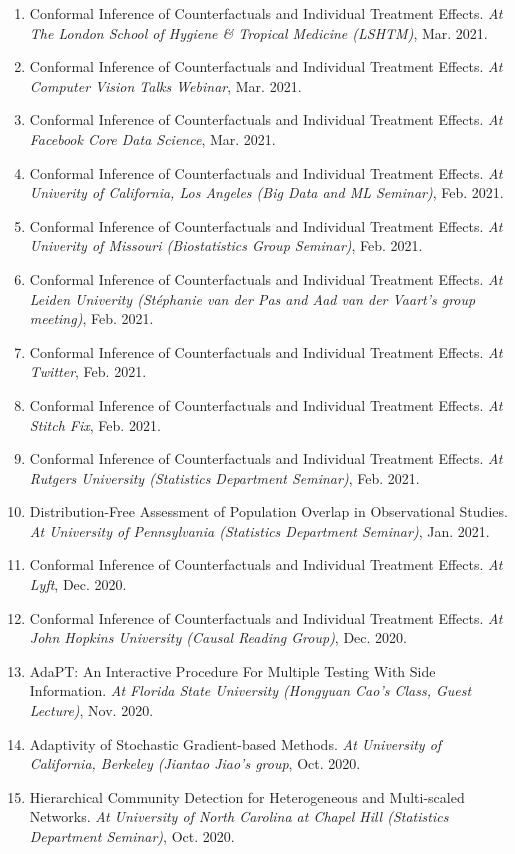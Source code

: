 \documentclass{article}
\begin{document}
\begin{enumerate}
\item Conformal Inference of Counterfactuals and Individual Treatment Effects. \emph{At The London School of Hygiene \& Tropical Medicine (LSHTM)}, Mar. 2021.
\item Conformal Inference of Counterfactuals and Individual Treatment Effects. \emph{At Computer Vision Talks Webinar}, Mar. 2021.
\item Conformal Inference of Counterfactuals and Individual Treatment Effects. \emph{At Facebook Core Data Science}, Mar. 2021.
\item Conformal Inference of Counterfactuals and Individual Treatment Effects. \emph{At Univerity of California, Los Angeles (Big Data and ML Seminar)}, Feb. 2021.
\item Conformal Inference of Counterfactuals and Individual Treatment Effects. \emph{At Univerity of Missouri (Biostatistics Group Seminar)}, Feb. 2021.
\item Conformal Inference of Counterfactuals and Individual Treatment Effects. \emph{At Leiden Univerity (Stéphanie van der Pas and Aad van der Vaart's group meeting)}, Feb. 2021.
\item Conformal Inference of Counterfactuals and Individual Treatment Effects. \emph{At Twitter}, Feb. 2021.
\item Conformal Inference of Counterfactuals and Individual Treatment Effects. \emph{At Stitch Fix}, Feb. 2021.
\item Conformal Inference of Counterfactuals and Individual Treatment Effects. \emph{At Rutgers University (Statistics Department Seminar)}, Feb. 2021.
\item Distribution-Free Assessment of Population Overlap in Observational Studies. \emph{At University of Pennsylvania (Statistics Department Seminar)}, Jan. 2021.
\item Conformal Inference of Counterfactuals and Individual Treatment Effects. \emph{At Lyft}, Dec. 2020.
\item Conformal Inference of Counterfactuals and Individual Treatment Effects. \emph{At John Hopkins University (Causal Reading Group)}, Dec. 2020.
\item AdaPT: An Interactive Procedure For Multiple Testing With Side Information. \emph{At Florida State University (Hongyuan Cao's Class, Guest Lecture)}, Nov. 2020. 
\item Adaptivity of Stochastic Gradient-based Methods. \emph{At University of California, Berkeley (Jiantao Jiao's group}, Oct. 2020. 
\item Hierarchical Community Detection for Heterogeneous and Multi-scaled Networks. \emph{At University of North Carolina at Chapel Hill (Statistics Department Seminar)}, Oct. 2020. 

\end{enumerate}
\end{document}
